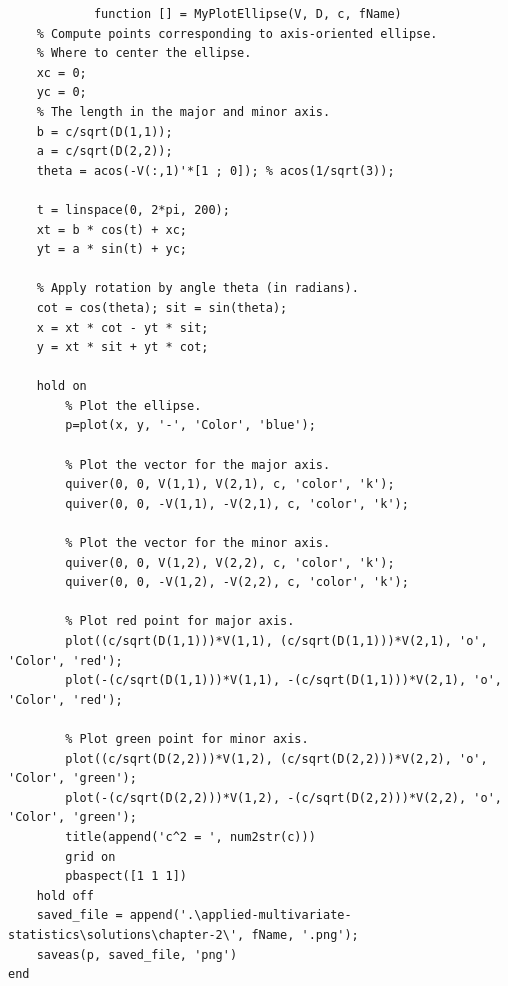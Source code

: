         \begin{lstlisting}
            function [] = MyPlotEllipse(V, D, c, fName)
    % Compute points corresponding to axis-oriented ellipse.
    % Where to center the ellipse.
    xc = 0;
    yc = 0;
    % The length in the major and minor axis.
    b = c/sqrt(D(1,1));
    a = c/sqrt(D(2,2));
    theta = acos(-V(:,1)'*[1 ; 0]); % acos(1/sqrt(3));
    
    t = linspace(0, 2*pi, 200);
    xt = b * cos(t) + xc;
    yt = a * sin(t) + yc;
    
    % Apply rotation by angle theta (in radians).
    cot = cos(theta); sit = sin(theta);
    x = xt * cot - yt * sit;
    y = xt * sit + yt * cot;

    hold on
        % Plot the ellipse.
        p=plot(x, y, '-', 'Color', 'blue');
        
        % Plot the vector for the major axis.
        quiver(0, 0, V(1,1), V(2,1), c, 'color', 'k');
        quiver(0, 0, -V(1,1), -V(2,1), c, 'color', 'k');
        
        % Plot the vector for the minor axis.
        quiver(0, 0, V(1,2), V(2,2), c, 'color', 'k');
        quiver(0, 0, -V(1,2), -V(2,2), c, 'color', 'k');
        
        % Plot red point for major axis.
        plot((c/sqrt(D(1,1)))*V(1,1), (c/sqrt(D(1,1)))*V(2,1), 'o', 'Color', 'red');
        plot(-(c/sqrt(D(1,1)))*V(1,1), -(c/sqrt(D(1,1)))*V(2,1), 'o', 'Color', 'red');
        
        % Plot green point for minor axis.
        plot((c/sqrt(D(2,2)))*V(1,2), (c/sqrt(D(2,2)))*V(2,2), 'o', 'Color', 'green');
        plot(-(c/sqrt(D(2,2)))*V(1,2), -(c/sqrt(D(2,2)))*V(2,2), 'o', 'Color', 'green');
        title(append('c^2 = ', num2str(c)))
        grid on
        pbaspect([1 1 1])
    hold off
    saved_file = append('.\applied-multivariate-statistics\solutions\chapter-2\', fName, '.png');
    saveas(p, saved_file, 'png')
end
        \end{lstlisting}